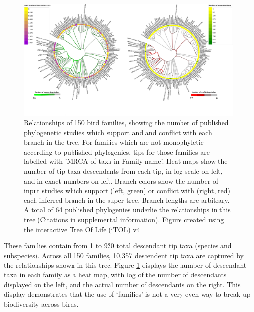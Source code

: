 \documentclass[oupdraft]{sysbio_sse}
\begin{document}
\begin{figure}[!h]
\centering\includegraphics[width=\textwidth]{bird_fam_fig}

\caption{Relationships of 150 bird families, showing the number of published phylogenetic studies which support and and conflict with each branch in the tree. For families which are not monophyletic according to published phylogenies, tips for those families are labelled with 'MRCA of taxa in Family name'. Heat maps show the number of tip taxa descendants from each tip, in log scale on left, and in exact numbers on left. Branch colors show the number of input studies which support (left, green) or conflict with (right, red) each inferred branch in the super tree. Branch lengths are arbitrary. A total of 64 published phylogenies underlie the relationships in this tree (Citations in supplemental information). Figure created using the interactive Tree Of Life (iTOL) v4 \citep{letunic_interactive_2019}}
\label{birdfams}
\end{figure}

These families contain from 1 to 920 total descendant tip taxa (species and subspecies).
Across all 150 families, 10,357 descendent tip taxa  are captured by the relationships shown in this tree.
Figure \ref{birdfams} displays the number of descendant taxa in each family as a heat map, with log of the number of descendants displayed on the left, and the actual number of descendants on the right.
This display demonstrates that the use of `families' is not a very even way to break up biodiversity across birds.
\end{document}
